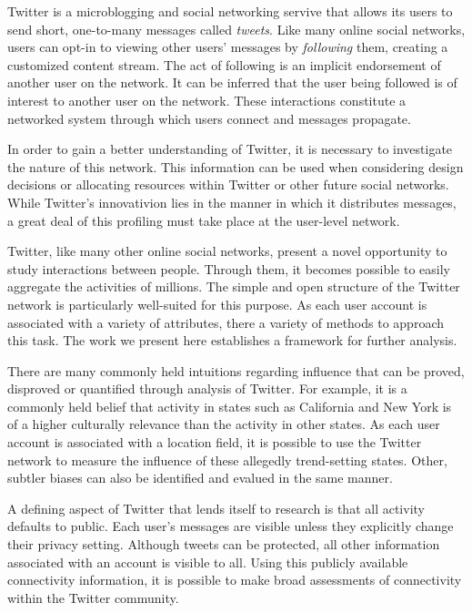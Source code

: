 Twitter is a microblogging and social networking servive that allows its users to send short, one-to-many messages called \textit{tweets}.  Like many online social networks, users can opt-in to viewing other users' messages by \textit{following} them, creating a customized content stream.  The act of following is an implicit endorsement of another user on the network.  It can be inferred that the user being followed is of interest to another user on the network.  These interactions constitute a networked system through which users connect and messages propagate.

In order to gain a better understanding of Twitter, it is necessary to investigate the nature of this network.  This information can be used when considering design decisions or allocating resources within Twitter or other future social networks.  While Twitter's innovativion lies in the manner in which it distributes messages, a great deal of this profiling must take place at the user-level network.

Twitter, like many other online social networks, present a novel opportunity to study interactions between people.  Through them, it becomes possible to easily aggregate the activities of millions.  The simple and open structure of the Twitter network is particularly well-suited for this purpose.  As each user account is associated with a variety of attributes, there a variety of methods to approach this task.  The work we present here establishes a framework for further analysis.

There are many commonly held intuitions regarding influence that can be proved, disproved or quantified through analysis of Twitter.  For example, it is a commonly held belief that activity in states such as California and New York is of a higher culturally relevance than the activity in other states.  As each user account is associated with a location field, it is possible to use the Twitter network to measure the influence of these allegedly trend-setting states.  Other, subtler biases can also be identified and evalued in the same manner.

A defining aspect of Twitter that lends itself to research is that all activity defaults to public.  Each user's messages are visible unless they explicitly change their privacy setting.  Although tweets can be protected, all other information associated with an account is visible to all.  Using this publicly available connectivity information, it is possible to make broad assessments of connectivity within the Twitter community.

